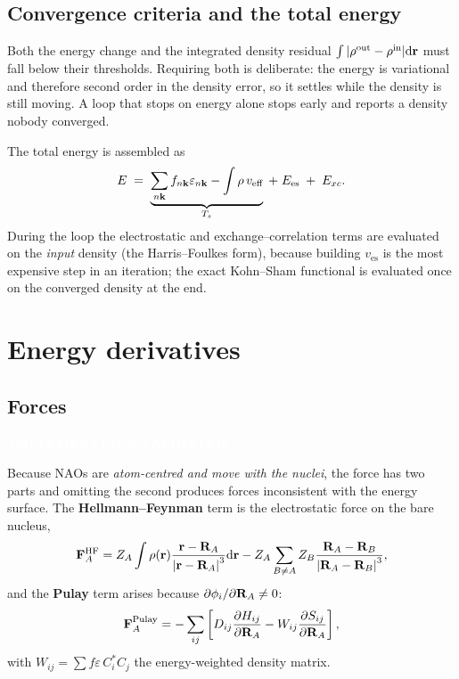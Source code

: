 \documentclass[11pt,a4paper]{article}
\newcommand{\badge}[2]{%
  \par\vspace{2pt}\noindent
  \colorbox{#1}{\textcolor{white}{\small\bfseries\,#2\,}}\par\vspace{4pt}}
\newcommand{\implemented}{\badge{okgreen}{IMPLEMENTED \& VALIDATED}}
\begin{document}
\subsection{Convergence criteria and the total energy}

Both the energy change and the integrated density residual
$\int\abs{\rho^{\text{out}} - \rho^{\text{in}}}\dd\vb{r}$ must fall below
their thresholds. Requiring both is deliberate: the energy is variational and
therefore second order in the density error, so it settles while the density
is still moving. A loop that stops on energy alone stops early and reports a
density nobody converged.

The total energy is assembled as
\begin{equation}
  E \;=\; \underbrace{\sum_{n\vb{k}} f_{n\vb{k}}\varepsilon_{n\vb{k}}
          - \int \rho\, v_{\text{eff}}}_{T_s}
       \;+\; E_{\text{es}} \;+\; E_{xc}.
\end{equation}
During the loop the electrostatic and exchange--correlation terms are
evaluated on the \emph{input} density (the Harris--Foulkes form), because
building $v_{\text{es}}$ is the most expensive step in an iteration; the exact
Kohn--Sham functional is evaluated once on the converged density at the end.

\section{Energy derivatives}
\label{sec:derivatives}

\subsection{Forces}
\label{sec:forces}
\implemented

Because NAOs are \emph{atom-centred and move with the nuclei}, the force has
two parts and omitting the second produces forces inconsistent with the energy
surface. The \textbf{Hellmann--Feynman} term is the electrostatic force on the
bare nucleus,
\begin{equation}
  \vb{F}_A^{\text{HF}} = Z_A \int \rho(\vb{r})
      \frac{\vb{r}-\vb{R}_A}{\abs{\vb{r}-\vb{R}_A}^3}\dd\vb{r}
      - Z_A \sum_{B \neq A} Z_B
        \frac{\vb{R}_A-\vb{R}_B}{\abs{\vb{R}_A-\vb{R}_B}^3},
\end{equation}
and the \textbf{Pulay} term arises because
$\partial\phi_i/\partial\vb{R}_A \neq 0$:
\begin{equation}
  \vb{F}_A^{\text{Pulay}} = -\sum_{ij}
    \left[ D_{ij}\pdv{H_{ij}}{\vb{R}_A}
         - W_{ij}\pdv{S_{ij}}{\vb{R}_A} \right],
\end{equation}
with $W_{ij} = \sum f\varepsilon\,C^{*}_{i}C_{j}$ the energy-weighted density
matrix.
\end{document}
